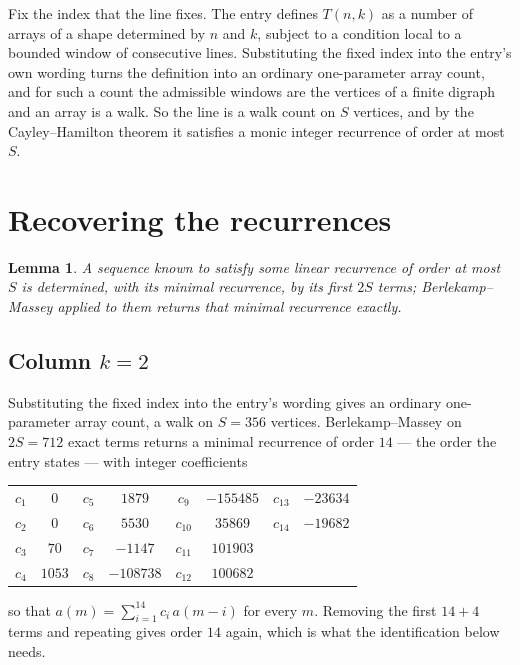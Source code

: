 \documentclass[11pt,a4paper]{article}
\theoremstyle{plain}
\newtheorem{lemma}[theorem]{Lemma}
\theoremstyle{definition}
\begin{document}
Fix the index that the line fixes. The entry defines $T(n,k)$ as a number of arrays of a shape
determined by $n$ and $k$, subject to a condition local to a bounded window of consecutive
lines. Substituting the fixed index into the entry's own wording turns the definition into an
ordinary one-parameter array count, and for such a count the admissible windows are the
vertices of a finite digraph and an array is a walk. So the line is a walk count on $S$
vertices, and by the Cayley--Hamilton theorem it satisfies a monic integer recurrence of order
at most $S$.

\section{Recovering the recurrences}

\begin{lemma}\label{lem:bm}
A sequence known to satisfy some linear recurrence of order at most $S$ is determined, with its
minimal recurrence, by its first $2S$ terms; Berlekamp--Massey applied to them returns that
minimal recurrence exactly.
\end{lemma}

\subsection*{Column $k=2$}
Substituting the fixed index into the entry's wording gives an ordinary one-parameter array
count, a walk on $S=356$ vertices. Berlekamp--Massey on $2S=712$ exact terms
returns a minimal recurrence of order $14$ --- the order the entry states --- with
integer coefficients
\begin{center}\small\begin{tabular}{cccccccc}
$c_{1}$ & $0$ & $c_{5}$ & $1879$ & $c_{9}$ & $-155485$ & $c_{13}$ & $-23634$ \\
$c_{2}$ & $0$ & $c_{6}$ & $5530$ & $c_{10}$ & $35869$ & $c_{14}$ & $-19682$ \\
$c_{3}$ & $70$ & $c_{7}$ & $-1147$ & $c_{11}$ & $101903$ &  &  \\
$c_{4}$ & $1053$ & $c_{8}$ & $-108738$ & $c_{12}$ & $100682$ &  &  \\
\end{tabular}\end{center}
so that $a(m)=\sum_{i=1}^{14}c_i\,a(m-i)$ for every $m$. Removing the first
$14+4$ terms and repeating gives order $14$ again, which is what the
identification below needs.
\end{document}
